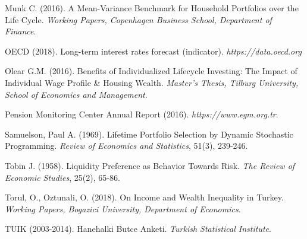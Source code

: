 \begin{description}
\item Munk C. (2016). A Mean-Variance Benchmark for Household Portfolios over the Life Cycle. \textit{Working Papers, Copenhagen Business School, Department of Finance}.
\item OECD (2018). Long-term interest rates forecast (indicator). \textit{https://data.oecd.org}
\item Olear G.M. (2016). Benefits of Individualized Lifecycle Investing: The Impact of Individual Wage Profile \& Housing Wealth. \textit{Master's Thesis, Tilburg University, School of Economics and Management}.
\item Pension Monitoring Center Annual Report (2016). \textit{https://www.egm.org.tr}.
\item Samuelson, Paul A. (1969). Lifetime Portfolio Selection by Dynamic Stochastic Programming. \textit{Review of Economics and Statistics}, 51(3), 239-246.
\item Tobin J. (1958). Liquidity Preference as Behavior Towards Risk. \textit{The Review of Economic Studies}, 25(2), 65-86.
\item Torul, O., Oztunali, O. (2018). On Income and Wealth Inequality in Turkey. \textit{Working Papers, Bogazici University, Department of Economics}.
\item TUIK (2003-2014). Hanehalki Butce Anketi. \textit{Turkish Statistical Institute}.
\end{description}
\endgroup
